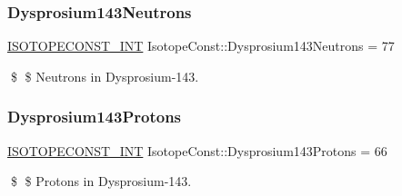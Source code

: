 \subsubsection{\texorpdfstring{Dysprosium143\+Neutrons}{Dysprosium143Neutrons}}
{\footnotesize\ttfamily \mbox{\hyperlink{group___isotope_const-_macros_ga5f18360b3e99483a35c32d789e62621c}{I\+S\+O\+T\+O\+P\+E\+C\+O\+N\+S\+T\+\_\+\+I\+NT}} Isotope\+Const\+::\+Dysprosium143\+Neutrons = 77}

\$ \$ Neutrons in Dysprosium-\/143. \mbox{\label{group___isotope_const-_dysprosium-_dy143_gaf8e5067bb0c895517a72363981cea99c}} 
\subsubsection{\texorpdfstring{Dysprosium143\+Protons}{Dysprosium143Protons}}
{\footnotesize\ttfamily \mbox{\hyperlink{group___isotope_const-_macros_ga5f18360b3e99483a35c32d789e62621c}{I\+S\+O\+T\+O\+P\+E\+C\+O\+N\+S\+T\+\_\+\+I\+NT}} Isotope\+Const\+::\+Dysprosium143\+Protons = 66}

\$ \$ Protons in Dysprosium-\/143. 